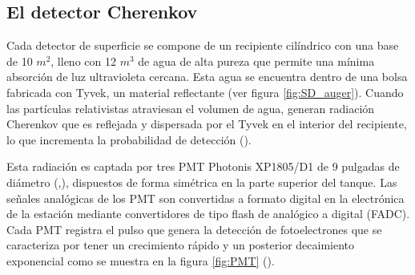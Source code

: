 \subsection{El detector Cherenkov}
 
Cada detector de superficie se compone de un recipiente cilíndrico con una base de 10 $m^{2}$, lleno con 12 $m^{3}$ de agua de alta pureza que permite una mínima absorción de luz ultravioleta cercana. Esta agua se encuentra dentro de una bolsa fabricada con Tyvek, un material reflectante (ver figura \ref{fig:SD_auger}). Cuando las partículas relativistas atraviesan el volumen de agua, generan radiación Cherenkov que es reflejada y dispersada por el Tyvek en el interior del recipiente, lo que incrementa la probabilidad de detección (\cite{allekotte_2008}).

Esta radiación es captada por tres PMT Photonis XP1805/D1 de 9 pulgadas de diámetro (\cite{bertou_2006},\cite{allekotte_2008}), dispuestos de forma simétrica en la parte superior del tanque. Las señales analógicas de los PMT son convertidas a formato digital en la electrónica de la estación mediante convertidores de tipo flash de analógico a digital (FADC). Cada PMT registra el pulso que genera la detección de fotoelectrones que se caracteriza por tener un crecimiento rápido y un posterior decaimiento exponencial como se muestra en la figura \ref{fig:PMT} (\cite{asorey_2012}).

